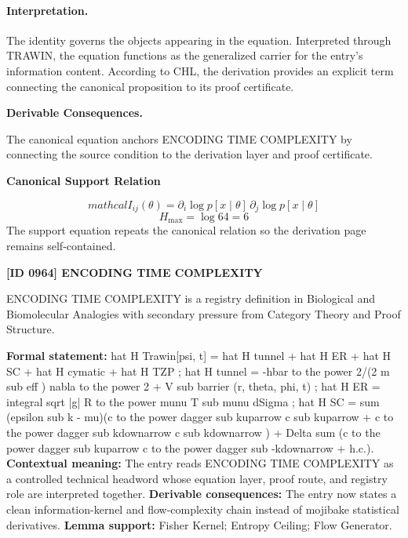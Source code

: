 \paragraph{Interpretation.}
The identity governs the objects appearing in the equation. Interpreted through TRAWIN, the equation functions as the generalized carrier for the entry’s information content. According to CHL, the derivation provides an explicit term connecting the canonical proposition to its proof certificate.

\par\vspace{0.35em}
\noindent\textbf{Derivable Consequences.}\quad
\begingroup
\footnotesize
\raggedright
The canonical equation anchors ENCODING TIME COMPLEXITY by connecting the source condition to the derivation layer and proof certificate.
\par\endgroup

\noindent\textbf{Canonical Support Relation}\par
\[
mathcal{I}_{ij}(\theta)=\partial_i \log p[x\mid\theta]\,\partial_j \log p[x\mid\theta]
\]
\[
H_{\max}=\log 64 = 6
\]
\noindent The support equation repeats the canonical relation so the derivation page remains self-contained.\par

\clearpage
\noindent\textbf{[ID 0964] ENCODING TIME COMPLEXITY}\par
\vspace{0.35em}
\begingroup\small
{}
ENCODING TIME COMPLEXITY is a registry definition in Biological and Biomolecular Analogies with secondary pressure from Category Theory and Proof Structure.

\begingroup\footnotesize\setlength{\emergencystretch}{3em}\sloppy
\textbf{Formal statement:} hat H Trawin[psi, t] = hat H tunnel + hat H ER + hat H SC + hat H cymatic + hat H TZP ; hat H tunnel = -hbar to the power 2/(2 m sub eff ) nabla to the power 2 + V sub barrier (r, theta, phi, t) ; hat H ER = integral sqrt |g| R to the power munu T sub munu dSigma ; hat H SC = sum (epsilon sub k - mu)(c to the power dagger sub kuparrow c sub kuparrow + c to the power dagger sub kdownarrow c sub kdownarrow ) + Delta sum (c to the power dagger sub kuparrow c to the power dagger sub -kdownarrow + h.c.). \textbf{Contextual meaning:} The entry reads ENCODING TIME COMPLEXITY as a controlled technical headword whose equation layer, proof route, and registry role are interpreted together. \textbf{Derivable consequences:} The entry now states a clean information-kernel and flow-complexity chain instead of mojibake statistical derivatives. \textbf{Lemma support:} Fisher Kernel; Entropy Ceiling; Flow Generator.\par
\endgroup

